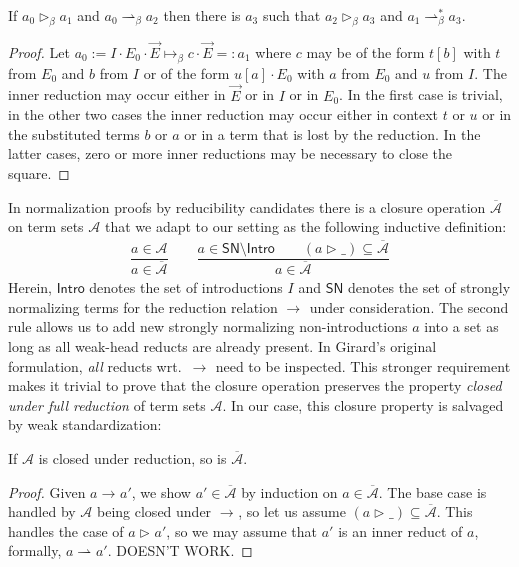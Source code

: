 \documentclass[a4paper,USenglish,cleveref, autoref, thm-restate]{lipics-v2019}
\newcommand{\ru}{\dfrac}
\newcommand{\contract}[1][]{\mapsto_{#1}}
\newcommand{\whd}[1][]{\rhd_{#1}}
\newcommand{\red}[1][]{\longrightarrow_{#1}}
\newcommand{\inner}[1][]{\rightharpoonup_{#1}}
\newcommand{\cl}[1]{\overline{#1}}
\newcommand{\A}{\mathcal{A}}
\newcommand{\SN}{\mathsf{SN}}
\newcommand{\Intro}{\mathsf{Intro}}
\begin{document}
\begin{lemma}
If $a_0 \whd[\beta] a_1$ and $a_0 \inner[\beta] a_2$ then
there is $a_3$ such that $a_2 \whd[\beta] a_3$ and $a_1 \inner[\beta]^* a_3$.
\end{lemma}
\begin{proof}
  Let $a_0 := I \cdot E_0 \cdot \vec E \contract[\beta] c \cdot \vec E
  =: a_1$ where
  $c$ may be of the form $t[b]$ with $t$ from $E_0$ and $b$ from $I$
  or of the form $u[a] \cdot E_0$ with $a$ from $E_0$ and $u$ from
  $I$.
  The inner reduction may occur either in $\vec E$ or in $I$ or in
  $E_0$.  In the first case is trivial, in the other two cases the
  inner reduction may occur either in context $t$ or $u$ or in the
  substituted terms $b$ or $a$ or in a term that is lost by the
  reduction.  In the latter cases, zero or more inner reductions may
  be necessary to close the square.
\end{proof}

In normalization proofs by reducibility candidates there is a closure
operation $\cl\A$ on term sets $\A$ that we adapt to our setting as
the following inductive definition:
\begin{gather*}
  \ru{a \in \A
    }{a \in \cl\A}
\qquad
  \ru{a \in \SN \setminus \Intro \qquad
      (a \whd \_) \subseteq \cl\A
    }{a \in \cl\A}
\end{gather*}
Herein, $\Intro$ denotes the set of introductions $I$ and $\SN$
denotes the set of strongly normalizing terms for the reduction
relation $\red$ under consideration.  The second rule allows us to add
new strongly normalizing non-introductions $a$ into a set as long as
all weak-head reducts are already present.  In Girard's original
formulation, \emph{all} reducts wrt.\ $\red$ need to be inspected.
This stronger requirement makes it trivial to prove that the closure
operation preserves the property \emph{closed under full reduction} of
term sets $\A$.  In our case, this closure property is salvaged by
weak standardization:
\begin{lemma}
  If $\A$ is closed under reduction, so is $\cl\A$.
\end{lemma}
\begin{proof}
  Given $a \red a'$, we show $a' \in \cl\A$ by induction on $a \in
  \cl\A$.  The base case is handled by $\A$ being closed under $\red$,
  so let us assume $(a \whd \_) \subseteq \cl\A$.  This handles the
  case of $a \whd a'$, so we may assume that $a'$ is an inner reduct
  of $a$, formally, $a \inner a'$.
  DOESN'T WORK.
\end{proof}





\end{document}

